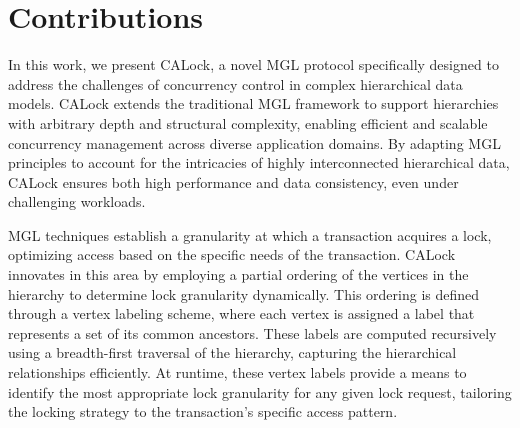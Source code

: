 


\section{Contributions}

In this work, we present CALock, a novel MGL protocol specifically designed to address the challenges of concurrency control in complex hierarchical data models. CALock extends the traditional MGL framework to support hierarchies with arbitrary depth and structural complexity, enabling efficient and scalable concurrency management across diverse application domains. By adapting MGL principles to account for the intricacies of highly interconnected hierarchical data, CALock ensures both high performance and data consistency, even under challenging workloads.

MGL techniques establish a granularity at which a transaction acquires a lock, optimizing access based on the specific needs of the transaction. CALock innovates in this area by employing a partial ordering of the vertices in the hierarchy to determine lock granularity dynamically. This ordering is defined through a vertex labeling scheme, where each vertex is assigned a label that represents a set of its common ancestors. These labels are computed recursively using a breadth-first traversal of the hierarchy, capturing the hierarchical relationships efficiently. At runtime, these vertex labels provide a means to identify the most appropriate lock granularity for any given lock request, tailoring the locking strategy to the transaction’s specific access pattern.

